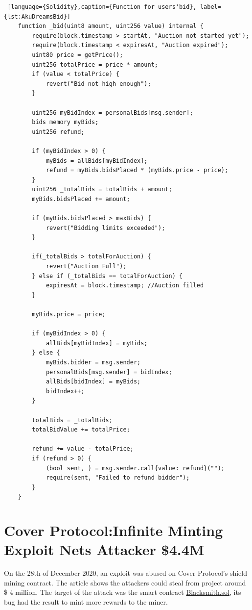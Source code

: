 \begin{lstlisting} [language={Solidity},caption={Function for users'bid}, label={lst:AkuDreamsBid}]
    function _bid(uint8 amount, uint256 value) internal {
        require(block.timestamp > startAt, "Auction not started yet");
        require(block.timestamp < expiresAt, "Auction expired");
        uint80 price = getPrice();
        uint256 totalPrice = price * amount;
        if (value < totalPrice) {
            revert("Bid not high enough");
        }
        
        uint256 myBidIndex = personalBids[msg.sender];
        bids memory myBids;
        uint256 refund;

        if (myBidIndex > 0) {
            myBids = allBids[myBidIndex];
            refund = myBids.bidsPlaced * (myBids.price - price);
        }
        uint256 _totalBids = totalBids + amount;
        myBids.bidsPlaced += amount;

        if (myBids.bidsPlaced > maxBids) {
            revert("Bidding limits exceeded");
        }

        if(_totalBids > totalForAuction) {
            revert("Auction Full");
        } else if (_totalBids == totalForAuction) {
            expiresAt = block.timestamp; //Auction filled
        }

        myBids.price = price;

        if (myBidIndex > 0) {
            allBids[myBidIndex] = myBids;
        } else {
            myBids.bidder = msg.sender;
            personalBids[msg.sender] = bidIndex;
            allBids[bidIndex] = myBids;
            bidIndex++;
        }
        
        totalBids = _totalBids;
        totalBidValue += totalPrice;

        refund += value - totalPrice;
        if (refund > 0) {
            (bool sent, ) = msg.sender.call{value: refund}("");
            require(sent, "Failed to refund bidder");
        }
    }
\end{lstlisting}

\section{Cover Protocol:Infinite Minting Exploit Nets Attacker \$4.4M }
\label{sec:Exploits:CoverProtocol}
On the 28th of December 2020, an exploit was abused on Cover Protocol's shield mining contract. 
The article shows the attackers could steal from project around \$ 4 million. 
The target of the attack was the smart contract \href{https://github.com/CoverProtocol/cover-token-mining/blob/main/contracts/Blacksmith.sol}{Blacksmith.sol}, its bug had the result to mint more rewards to the miner. 

